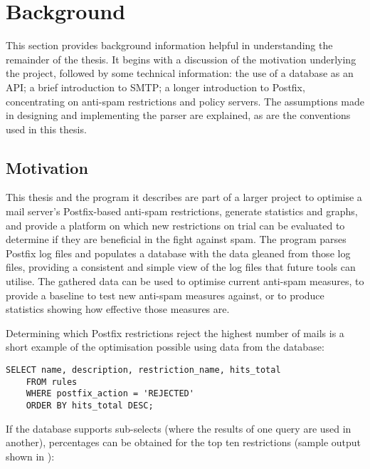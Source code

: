 \section{Background}

\label{background}

This section provides background information helpful in understanding the
remainder of the thesis.  It begins with a discussion of the motivation
underlying the project, followed by some technical information: the use of
a database as an \gls{API}\@; a brief introduction to \gls{SMTP}\@; a
longer introduction to Postfix, concentrating on anti-spam restrictions and
policy servers.  The assumptions made in designing and implementing the
parser are explained, as are the conventions used in this thesis.

\subsection{Motivation}

\label{motivation}

This thesis and the program it describes are part of a larger project to
optimise a mail server's Postfix-based anti-spam restrictions, generate
statistics and graphs, and provide a platform on which new restrictions on
trial can be evaluated to determine if they are beneficial in the fight
against spam.  The program parses Postfix log files and populates a
database with the data gleaned from those log files, providing a consistent
and simple view of the log files that future tools can utilise.  The
gathered data can be used to optimise current anti-spam measures, to
provide a baseline to test new anti-spam measures against, or to produce
statistics showing how effective those measures are.

Determining which Postfix restrictions reject the highest number of mails
is a short example of the optimisation possible using data from the
database:

\begin{verbatim}
SELECT name, description, restriction_name, hits_total
    FROM rules
    WHERE postfix_action = 'REJECTED'
    ORDER BY hits_total DESC;
\end{verbatim}

If the database supports sub-selects (where the results of one query are
used in another), percentages can be obtained for the top ten restrictions
(sample output shown in ):

